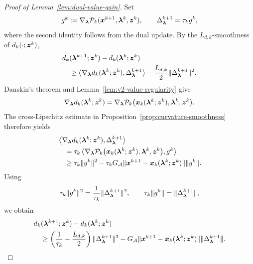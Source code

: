 \begin{proof}[Proof of Lemma~\ref{lem:dual-value-gain}]
Set
\[
    g^k
    :=
    \nabla_{\bm{\lambda}}\mathcal P_k
    (\bm{x}^{k+1},\bm{\lambda}^k,\bm{z}^k),
    \qquad
    \Delta_{\bm{\lambda}}^{k+1}=\tau_k g^k,
\]
where the second identity follows from the dual update.
By the $L_{d,k}$-smoothness of $d_k(\cdot;\bm{z}^k)$,
\[
\begin{aligned}
&d_k(\bm{\lambda}^{k+1};\bm{z}^k)-d_k(\bm{\lambda}^k;\bm{z}^k) \\
&\quad\ge
\left\langle
\nabla_{\bm{\lambda}}d_k(\bm{\lambda}^k;\bm{z}^k),
\Delta_{\bm{\lambda}}^{k+1}
\right\rangle
-\frac{L_{d,k}}{2}
\|\Delta_{\bm{\lambda}}^{k+1}\|^2.
\end{aligned}
\]
Danskin's theorem and Lemma~\ref{lem:v2-value-regularity} give
\[
\nabla_{\bm{\lambda}}d_k(\bm{\lambda}^k;\bm{z}^k)
=
\nabla_{\bm{\lambda}}\mathcal P_k
\bigl(\bm{x}_k(\bm{\lambda}^k;\bm{z}^k),\bm{\lambda}^k,\bm{z}^k\bigr).
\]
The cross-Lipschitz estimate in
Proposition~\ref{prop:curvature-smoothness} therefore yields
\[
\begin{aligned}
&\left\langle
\nabla_{\bm{\lambda}}d_k(\bm{\lambda}^k;\bm{z}^k),
\Delta_{\bm{\lambda}}^{k+1}
\right\rangle \\
&\quad=
\tau_k\left\langle
\nabla_{\bm{\lambda}}\mathcal P_k
\bigl(\bm{x}_k(\bm{\lambda}^k;\bm{z}^k),\bm{\lambda}^k,\bm{z}^k\bigr),g^k
\right\rangle \\
&\quad\ge
\tau_k\|g^k\|^2
-\tau_kG_{\cal A}
\|\bm{x}^{k+1}-\bm{x}_k(\bm{\lambda}^k;\bm{z}^k)\|\|g^k\|.
\end{aligned}
\]
Using
\[
    \tau_k\|g^k\|^2
    =\frac{1}{\tau_k}\|\Delta_{\bm{\lambda}}^{k+1}\|^2,
    \qquad
    \tau_k\|g^k\|
    =\|\Delta_{\bm{\lambda}}^{k+1}\|,
\]
we obtain
\begin{equation}
\begin{aligned}
&d_k(\bm{\lambda}^{k+1};\bm{z}^k)-d_k(\bm{\lambda}^k;\bm{z}^k) \\
&\quad\ge
\left(\frac{1}{\tau_k}-\frac{L_{d,k}}{2}\right)
\|\Delta_{\bm{\lambda}}^{k+1}\|^2
-G_{\cal A}\|\bm{x}^{k+1}-\bm{x}_k(\bm{\lambda}^k;\bm{z}^k)\|
\|\Delta_{\bm{\lambda}}^{k+1}\|.
\end{aligned}
\label{eq:dual-value-gain-appendix}
\end{equation}


\end{proof}
